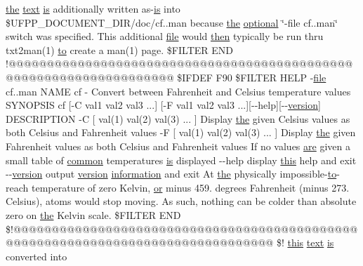 \hyperlink{M__stopwatch_83_8txt_a0f266597de2e57eb3aa964927bb30e14}{the} \hyperlink{notes_8txt_ad997a48ee1fbabed5333859846b5d9a3}{text} \hyperlink{intro__blas1_83_8txt_a42a91df93f840595de3019ceb5d1df23}{is} additionally written as-\/\hyperlink{intro__blas1_83_8txt_a42a91df93f840595de3019ceb5d1df23}{is} into \$U\+F\+P\+P\+\_\+\+D\+O\+C\+U\+M\+E\+N\+T\+\_\+\+D\+IR/doc/cf..\+man because \hyperlink{M__stopwatch_83_8txt_a0f266597de2e57eb3aa964927bb30e14}{the} \hyperlink{option__stopwatch_83_8txt_aa4ece75e7acf58a4843f70fe18c3ade5}{optional} \char`\"{}-\/file cf..\+man\char`\"{} switch was specified. This additional \hyperlink{what__overview_81_8txt_a447b56c526e8da30e0dc94673727ee25}{file} would \hyperlink{intro__blas1_83_8txt_aeaad1761c101f906d503f68274bd4b83}{then} typically be run thru txt2man(1) \hyperlink{M__stopwatch_83_8txt_a97209fd3e34ef701c0a9734280779cbb}{to} create a man(1) page. \$F\+I\+L\+T\+ER E\+ND !@@@@@@@@@@@@@@@@@@@@@@@@@@@@@@@@@@@@@@@@@@@@@@@@@@@@@@@@@@@@@@@@@@@ \$I\+F\+D\+EF F90 \$F\+I\+L\+T\+ER H\+E\+LP -\/\hyperlink{what__overview_81_8txt_a447b56c526e8da30e0dc94673727ee25}{file} cf..\+man N\+A\+ME cf -\/ Convert between Fahrenheit and Celsius temperature values S\+Y\+N\+O\+P\+S\+IS cf \mbox{[}-\/C val1 val2 val3 ...\mbox{]} \mbox{[}-\/F val1 val2 val3 ...\mbox{]}\mbox{[}-\/-\/help\mbox{]}\mbox{[}-\/-\/\hyperlink{inquiry__stopwatch_83_8txt_aee378be19d20935dd436517beda00ee4}{version}\mbox{]} D\+E\+S\+C\+R\+I\+P\+T\+I\+ON -\/C \mbox{[} val(1) val(2) val(3) ... \mbox{]} Display \hyperlink{M__stopwatch_83_8txt_a0f266597de2e57eb3aa964927bb30e14}{the} given Celsius values as both Celsius and Fahrenheit values -\/F \mbox{[} val(1) val(2) val(3) ... \mbox{]} Display \hyperlink{M__stopwatch_83_8txt_a0f266597de2e57eb3aa964927bb30e14}{the} given Fahrenheit values as both Celsius and Fahrenheit values If no values \hyperlink{M__stopwatch_83_8txt_a5040be02b832eba08820289c8a1f81c4}{are} given a small table of \hyperlink{strgar3_8f90_a96cfa8fe4e730b87185eb5629575c039}{common} temperatures \hyperlink{intro__blas1_83_8txt_a42a91df93f840595de3019ceb5d1df23}{is} displayed -\/-\/help display \hyperlink{M__stopwatch_83_8txt_ad62a52042bb610eee5b36b5516caec22}{this} help and exit -\/-\/\hyperlink{inquiry__stopwatch_83_8txt_aee378be19d20935dd436517beda00ee4}{version} output \hyperlink{inquiry__stopwatch_83_8txt_aee378be19d20935dd436517beda00ee4}{version} \hyperlink{M__stopwatch_83_8txt_a9f7f0ce21871efda7da3eda76d1d3cff}{information} and exit At \hyperlink{M__stopwatch_83_8txt_a0f266597de2e57eb3aa964927bb30e14}{the} physically impossible-\/\hyperlink{M__stopwatch_83_8txt_a97209fd3e34ef701c0a9734280779cbb}{to}-\/reach temperature of zero Kelvin, \hyperlink{what__overview_81_8txt_a93f5d39a36ed511cc0dc88a20a517388}{or} minus 459. degrees Fahrenheit (minus 273. Celsius), atoms would stop moving. As such, nothing can be colder than absolute zero on \hyperlink{M__stopwatch_83_8txt_a0f266597de2e57eb3aa964927bb30e14}{the} Kelvin scale. \$F\+I\+L\+T\+ER E\+ND \$!@@@@@@@@@@@@@@@@@@@@@@@@@@@@@@@@@@@@@@@@@@@@@@@@@@@@@@@@@@@@@@@@@@@@@@@@@@@@@@@@ \$! \hyperlink{M__stopwatch_83_8txt_ad62a52042bb610eee5b36b5516caec22}{this} \hyperlink{notes_8txt_ad997a48ee1fbabed5333859846b5d9a3}{text} \hyperlink{intro__blas1_83_8txt_a42a91df93f840595de3019ceb5d1df23}{is} converted into 